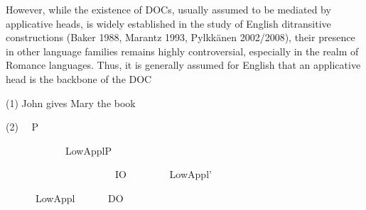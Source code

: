 \begin{stylePrrafodelista}
\textmd{However, while the existence of DOCs, usually assumed to be mediated by applicative heads, is widely established in the study of English ditransitive constructions (Baker 1988, Marantz 1993, Pylkkänen 2002/2008), their presence in other language families remains highly controversial, especially in the realm of Romance languages. Thus, it is generally assumed for English that an applicative head is the backbone of the DOC }\hyperlink{bookmark}{}\hyperlink{bookmark1}{}\textstyleHyperlink{:}
\end{stylePrrafodelista}

\begin{styleListNumberi}
(1) John gives Mary the book
\end{styleListNumberi}

\begin{styleBodyA}
(2) \ \ P
\end{styleBodyA}

\begin{styleBodyA}
\end{styleBodyA}

\begin{styleBodyA}
 \ \ \ \ \ \ \ \ \ \ \ \ LowApplP
\end{styleBodyA}

\begin{styleBodyA}
\end{styleBodyA}

\begin{styleBodyA}
\ \ \ \ \ \ \ \ \ \ \ \ \ \ \ \ \ \ \ \ \ \ IO \ \ \ \ \ \ \ \ LowAppl’
\end{styleBodyA}

\begin{styleBodyA}
\end{styleBodyA}

\begin{styleBodyA}
\ \ \ \  \ \ LowAppl \ \ \ \ \ \ DO
\end{styleBodyA}

